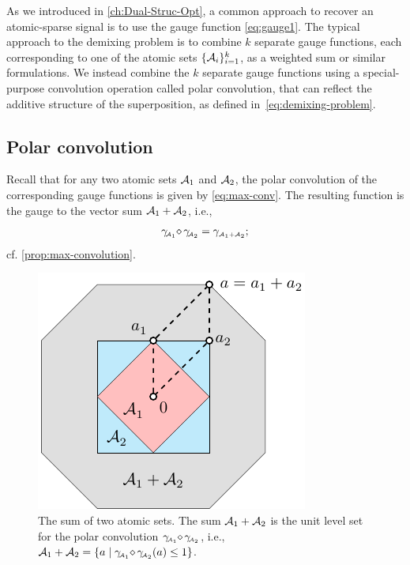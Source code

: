 As we introduced in \autoref{ch:Dual-Struc-Opt}, a common approach to recover an atomic-sparse signal is to use the gauge function \eqref{eq:gauge1}. The typical approach to the demixing problem is to combine $k$ separate gauge functions, each corresponding to one of the atomic sets $\{\mathcal{A}_i\}_{i=1}^k$, as a weighted sum or similar formulations. We instead combine the $k$ separate gauge functions using a special-purpose convolution operation called polar convolution, that can reflect the additive structure of the superposition, as defined in~\eqref{eq:demixing-problem}.

\subsection{Polar convolution} \label{sec:3-1-1}

Recall that for any two atomic sets $\mathcal{A}_1$ and $\mathcal{A}_2$, the polar convolution of the corresponding gauge functions is given by \eqref{eq:max-conv}.
The resulting function is the gauge to the vector sum $\mathcal{A}_1+\mathcal{A}_2$, i.e.,
\begin{equation}\label{eq-polar-convolution-sum}
  \gamma_{\!\scriptscriptstyle\mathcal{A}_1}\!\mathop{\diamond}\gamma_{\!\scriptscriptstyle\mathcal{A}_2} = \gamma_{\scriptscriptstyle\mathcal{A}_1+\mathcal{A}_2};
\end{equation}
cf. \autoref{prop:max-convolution}. 

\begin{figure}[t]
    \centering
    \includegraphics[page=1]{./figures/illustrations2.pdf}
    \caption{The sum of two atomic sets. The sum \(\mathcal{A}_1+\mathcal{A}_2\) is the unit level set for the polar convolution $\gamma_{\!\scriptscriptstyle\mathcal{A}_1}\!\mathop{\diamond}\gamma_{\!\scriptscriptstyle\mathcal{A}_2}$, i.e., $\mathcal{A}_1+\mathcal{A}_2 = \{a \mid \gamma_{\!\scriptscriptstyle\mathcal{A}_1}\!\mathop{\diamond}\gamma_{\!\scriptscriptstyle\mathcal{A}_2}(a) \leq 1\}$.\label{fig:sum-sets}}
\end{figure}

